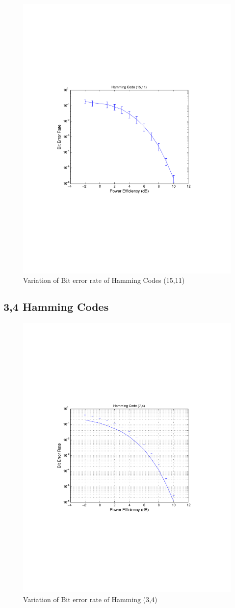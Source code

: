 \documentclass[11pt, english]{article}
\begin{document}
\begin{figure}[H]
    \centering
    \includegraphics[width=.8\textwidth]{hamming_15_11_incomplete_run_ber.pdf}
    \caption{Variation of Bit error rate of Hamming Codes (15,11)}
    \label{ham_15_11_ber}
\end{figure}


\subsection{3,4 Hamming Codes}
\begin{figure}[H]
    \centering
    \includegraphics[width=.8\textwidth]{ber_hamming_3_4.pdf}
    \caption{Variation of Bit error rate of Hamming (3,4)}
    \label{h34}
\end{figure}
\end{document}
